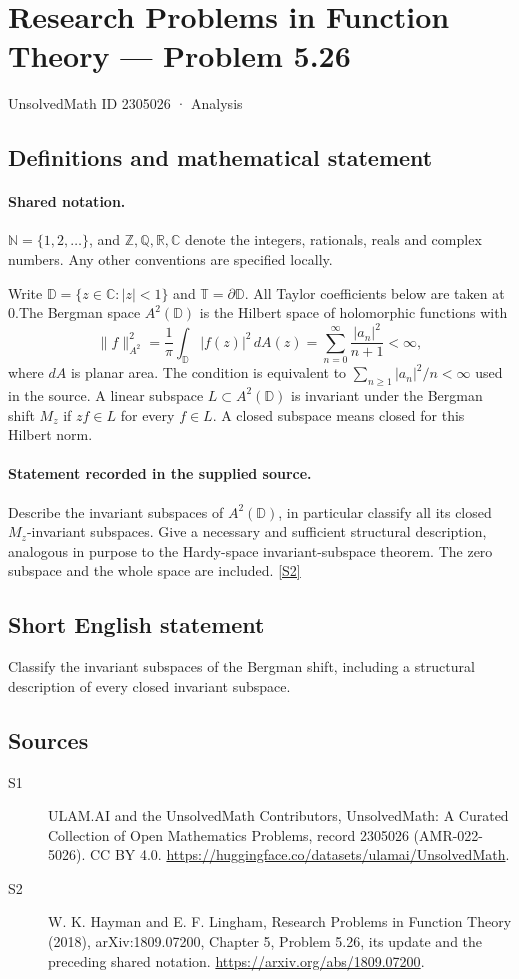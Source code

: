 \documentclass[11pt]{article}
\newcommand{\sref}[2]{\hyperlink{source:#1:#2}{[S#2]}}
\begin{document}
\setcounter{section}{2305025}
\section{Research Problems in Function Theory — Problem 5.26}\label{2305026}
{\small\sffamily UnsolvedMath ID 2305026 · Analysis}
\subsection{Definitions and mathematical statement}

\paragraph{Shared notation.}$\mathbb N=\{1,2,\ldots\}$, and $\mathbb Z,\mathbb Q,\mathbb R,\mathbb C$ denote the integers, rationals, reals and complex numbers. Any other conventions are specified locally.


Write $\mathbb D=\{z\in\mathbb C:|z|<1\}$ and $\mathbb T=\partial\mathbb D$. All Taylor coefficients below are taken at $0$.The Bergman space $A^2(\mathbb D)$ is the Hilbert space of holomorphic functions with
\[\|f\|_{A^2}^2=\frac1\pi\int_{\mathbb D}|f(z)|^2\,dA(z)=\sum_{n=0}^\infty\frac{|a_n|^2}{n+1}<\infty,
\]
where $dA$ is planar area. The condition is equivalent to $\sum_{n\ge1}|a_n|^2/n<\infty$ used in the source. A linear subspace $L\subset A^2(\mathbb D)$ is invariant under the Bergman shift $M_z$ if $zf\in L$ for every $f\in L$. A closed subspace means closed for this Hilbert norm.
\paragraph{Statement recorded in the supplied source.}
Describe the invariant subspaces of $A^2(\mathbb D)$, in particular classify all its closed $M_z$-invariant subspaces. Give a necessary and sufficient structural description, analogous in purpose to the Hardy-space invariant-subspace theorem. The zero subspace and the whole space are included. \sref{2305026}{2}
\subsection{Short English statement}
Classify the invariant subspaces of the Bergman shift, including a structural description of every closed invariant subspace.
\subsection{Sources}
\begin{description}
\item[\hypertarget{source:2305026:1}{S1}] ULAM.AI and the UnsolvedMath Contributors, UnsolvedMath: A Curated Collection of Open Mathematics Problems, record 2305026 (AMR-022-5026). CC BY 4.0. \url{https://huggingface.co/datasets/ulamai/UnsolvedMath}.
\item[\hypertarget{source:2305026:2}{S2}] W. K. Hayman and E. F. Lingham, Research Problems in Function Theory (2018), arXiv:1809.07200, Chapter 5, Problem 5.26, its update and the preceding shared notation. \url{https://arxiv.org/abs/1809.07200}.
\end{description}
\label{end:2305026}
\end{document}
